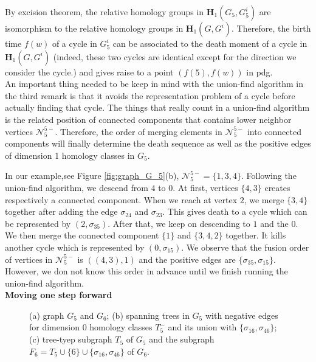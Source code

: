\documentclass[a4paper,12pt]{article}
\numberwithin{equation}{section}
\begin{document}
	By excision theorem, the relative homology groups in $\mathbf{H}_1(G_5,G_5^i)$ are isomorphism to the relative homology groups in $\mathbf{H}_1(G, G^i)$. Therefore, the birth time $f(w)$ of a cycle in $G^{i}_5$ can be associated to the death moment of a cycle in $\mathbf{H}_1(G, G^i)$ (indeed, these two cycles are identical except for the direction we consider the cycle.) and gives raise to a point $(f(5), f(w))$ in pdg. \\
	
	
	
	An important thing needed to be keep in mind with the union-find algorithm in the third remark is that it avoids the representation problem of a cycle before actually finding that cycle. The things that really count in a union-find algorithm is the related position of connected components that contains lower neighbor vertices $\mathcal{N}_5^{5-}$. Therefore, the order of merging elements in $\mathcal{N}_5^{5-}$ into connected components will finally determine the death sequence as well as the positive edges of dimension 1 homology classes in $G_5$.
	
	In our example,see Figure \ref{fig:graph_G_5}(b), $\mathcal{N}^{5-}_5 = \{1,3,4\}$. Following the union-find algorithm, we descend from $4$ to $0$. At first, vertices $\{4,3\}$ creates respectively a connected component. When we reach at vertex $2$, we merge $\{3,4\}$ together after adding the edge $\sigma_{24}$ and $\sigma_{23}$. This gives death to a cycle which can be represented by $(2, \sigma_{35})$. After that, we keep on descending to $1$ and the $0$. We then merge the connected component $\{1\}$ and $\{3,4,2\}$ together. It kills another cycle which is represented by $(0, \sigma_{15})$. We observe that the fusion order of vertices in $\mathcal{N}^{5-}_5$ is $((4,3),1)$ and the positive edges are $\{\sigma_{35}, \sigma_{15} \}$. However, we don not know this order in advance until we finish running the union-find algorithm. \\

		
	\noindent
	\textbf{Moving one step forward}\\
		
	\begin{figure}[!hbtp]
		\centering				
		\caption{(a) graph $G_5$ and $G_6$; (b) spanning trees in $G_5$ with negative edges for dimension 0 homology classes $T^{-}_5$ and its union with $\{ \sigma_{16}, \sigma_{46} \}$; (c) tree-tyep subgraph $T_5$ of $G_5$ and the subgraph $F_6 = T_5 \cup \{6 \} \cup \{ \sigma_{16}, \sigma_{46} \}$ of $G_6$.}
		\label{fig:graph_F_6}		
	\end{figure}
	
\end{document}
